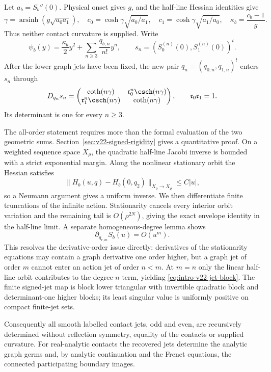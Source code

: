 Let $a_b=S_b''(0)$.  Physical onset gives $g$, and the half-line Hessian
identities give
\begin{equation}\label{eq:intro-v22-leading}
 \gamma=\operatorname{arsinh}(g\sqrt{a_0a_1}),
 \quad
 c_0=\cosh\gamma\sqrt{a_0/a_1},
 \quad
 c_1=\cosh\gamma\sqrt{a_1/a_0},
 \quad
 \kappa_b=\frac{c_b-1}{g}.
\end{equation}
Thus neither contact curvature is supplied.  Write
\[
 \psi_b(y)=\frac{\kappa_b}{2}y^2+
 \sum_{n\ge3}\frac{q_{b,n}}{n!}y^n,
 \qquad
 s_n=(S_0^{(n)}(0),S_1^{(n)}(0))^t.
\]
After the lower graph jets have been fixed, the new pair
$q_n=(q_{0,n},q_{1,n})^t$ enters $s_n$ through
\begin{equation}\label{eq:intro-v22-jet-block}
 D_{q_n}s_n=
 \begin{pmatrix}
 \coth(n\gamma)&\mathfrak r_0^n\csch(n\gamma)\\
 \mathfrak r_1^n\csch(n\gamma)&\coth(n\gamma)
 \end{pmatrix},
 \qquad \mathfrak r_0\mathfrak r_1=1.
\end{equation}
Its determinant is one for every $n\ge3$.

The all-order statement requires more than the formal evaluation of the two
geometric sums.  Section~\ref{sec:v22-signed-rigidity} gives a quantitative
proof.  On a weighted sequence space $X_\rho$, the quadratic half-line Jacobi
inverse is bounded with a strict exponential margin.  Along the nonlinear
stationary orbit the Hessian satisfies
\[
 \|H_b(u,q)-H_b(0,q_2)\|_{X_\rho\to X_\rho}\le C|u|,
\]
so a Neumann argument gives a uniform inverse.  We then differentiate finite
truncations of the infinite action.  Stationarity cancels every interior
orbit variation and the remaining tail is $O(\rho^{2N})$, giving the exact
envelope identity in the half-line limit.  A separate homogeneous-degree
lemma shows
\[
                    \partial_{q_{r,m}}S_b(u)=O(u^m).
\]
This resolves the derivative-order issue directly: derivatives of the
stationarity equations may contain a graph derivative one order higher, but a
graph jet of order $m$ cannot enter an action jet of order $n<m$.  At $m=n$
only the linear half-line orbit contributes to the degree-$n$ term, yielding
\eqref{eq:intro-v22-jet-block}.  The finite signed-jet map is block lower
triangular with invertible quadratic block and determinant-one higher blocks;
its least singular value is uniformly positive on compact finite-jet sets.

Consequently all smooth labelled contact jets, odd and even, are recursively
determined without reflection symmetry, equality of the contacts or supplied
curvature.  For real-analytic contacts the recovered jets determine the
analytic graph germs and, by analytic continuation and the Frenet equations,
the connected participating boundary images.

